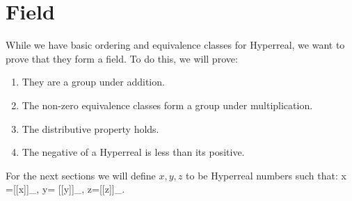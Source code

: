 \documentclass[12pt]{report}
\newcommand{\U}{\mathfrak{U}}
\begin{document}
\section*{Field}
While we have basic ordering and equivalence classes for Hyperreal, we want to prove that they form a field.
To do this, we will prove:
\begin{enumerate}
    \item They are a group under addition.
    \item The non-zero equivalence classes form a group under multiplication.
    \item The distributive property holds.
    \item The negative of a Hyperreal is less than its positive.
\end{enumerate}
For the next sections we will define $x,y,z$ to be Hyperreal numbers such that: x =[[x]]_{\U}, y= [[y]]_{\U}, z=[[z]]_{\U}.
\end{document}
